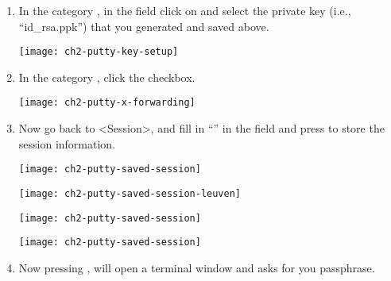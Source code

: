 \begin{enumerate}
    \item  In the category , in the
      field  click on
       and select the private key (i.e., ``id\_rsa.ppk'')
      that you generated and saved above.

      \begin{center}
      \texttt{[image: ch2-putty-key-setup]}
      \end{center}

    \item  In the category , click
      the  checkbox.

      \begin{center}
      \texttt{[image: ch2-putty-x-forwarding]}
      \end{center}

    \item  Now go back to <{}Session>{}, and fill in ``\emph{\hpcname}'' in the
       field and press  to
      store the session information.

\ifantwerpen
      \begin{center}
      \texttt{[image: ch2-putty-saved-session]}
      \end{center}
\fi
\ifleuven
      \begin{center}
      \texttt{[image: ch2-putty-saved-session-leuven]}
      \end{center}
\fi
\ifbrussel
      \begin{center}
      \texttt{[image: ch2-putty-saved-session]}
      \end{center}
\fi
\ifgent
      \begin{center}
      \texttt{[image: ch2-putty-saved-session]}
      \end{center}
\fi


    \item  Now pressing , will open a terminal window and
      asks for you passphrase.


\end{enumerate}

